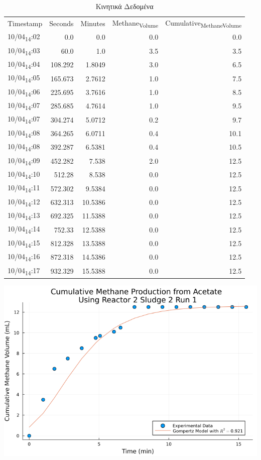 \documentclass[11pt]{article}
\begin{document}
\begin{table}[htbp]
\caption{Κινητικά Δεδομένα}
\centering
\begin{tabular}{lrrrr}
Timestamp & Seconds & Minutes & Methane\textsubscript{Volume} & Cumulative\textsubscript{Methane}\textsubscript{Volume}\\[0pt]
10/04\textsubscript{14}:02 & 0.0 & 0.0 & 0.0 & 0.0\\[0pt]
10/04\textsubscript{14}:03 & 60.0 & 1.0 & 3.5 & 3.5\\[0pt]
10/04\textsubscript{14}:04 & 108.292 & 1.8049 & 3.0 & 6.5\\[0pt]
10/04\textsubscript{14}:05 & 165.673 & 2.7612 & 1.0 & 7.5\\[0pt]
10/04\textsubscript{14}:06 & 225.695 & 3.7616 & 1.0 & 8.5\\[0pt]
10/04\textsubscript{14}:07 & 285.685 & 4.7614 & 1.0 & 9.5\\[0pt]
10/04\textsubscript{14}:07 & 304.274 & 5.0712 & 0.2 & 9.7\\[0pt]
10/04\textsubscript{14}:08 & 364.265 & 6.0711 & 0.4 & 10.1\\[0pt]
10/04\textsubscript{14}:08 & 392.287 & 6.5381 & 0.4 & 10.5\\[0pt]
10/04\textsubscript{14}:09 & 452.282 & 7.538 & 2.0 & 12.5\\[0pt]
10/04\textsubscript{14}:10 & 512.28 & 8.538 & 0.0 & 12.5\\[0pt]
10/04\textsubscript{14}:11 & 572.302 & 9.5384 & 0.0 & 12.5\\[0pt]
10/04\textsubscript{14}:12 & 632.313 & 10.5386 & 0.0 & 12.5\\[0pt]
10/04\textsubscript{14}:13 & 692.325 & 11.5388 & 0.0 & 12.5\\[0pt]
10/04\textsubscript{14}:14 & 752.33 & 12.5388 & 0.0 & 12.5\\[0pt]
10/04\textsubscript{14}:15 & 812.328 & 13.5388 & 0.0 & 12.5\\[0pt]
10/04\textsubscript{14}:16 & 872.318 & 14.5386 & 0.0 & 12.5\\[0pt]
10/04\textsubscript{14}:17 & 932.329 & 15.5388 & 0.0 & 12.5\\[0pt]
\end{tabular}
\end{table}

\begin{center}
\includegraphics[width=.9\linewidth]{../plots/BMPs/Acetate/methane_kinetics_acet_test_2_s2_min.png}
\end{center}
\end{document}
